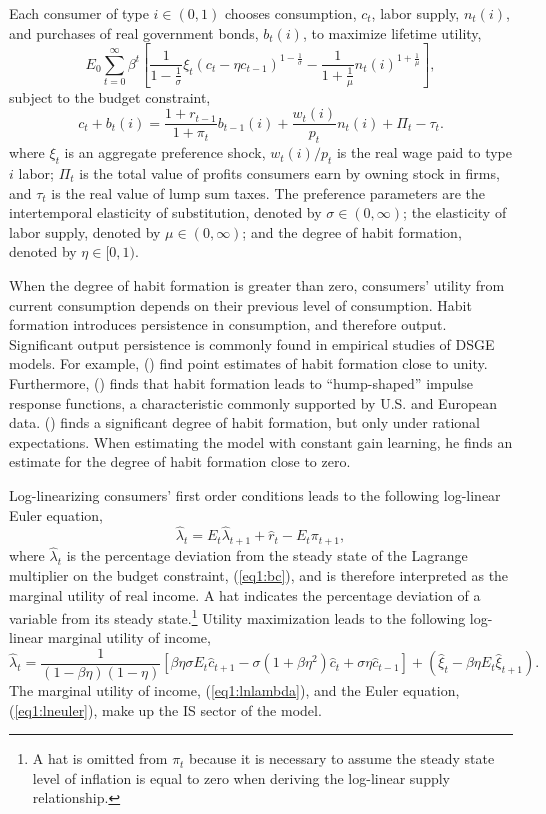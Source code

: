 \documentclass[11pt]{article}
\newcommand{\beq}{\begin{equation}}
\newcommand{\eeq}{\end{equation}}
\newcommand{\citee}[1]{\citeauthor*{#1} (\citeyear{#1})}
\newcommand{\h}[1]{\hat{#1}}
\begin{document}
Each consumer of type $i\in(0,1)$ chooses consumption, $c_t$, labor supply, $n_t(i)$, and purchases of real government bonds, $b_{t}(i)$, to maximize lifetime utility,
\beq \label{eq1:util} E_0 \sum_{t=0}^{\infty} \beta^t \left[ \frac{1}{1-\frac{1}{\sigma}} \xi_t \left(c_t - \eta c_{t-1}\right)^{1-\frac{1}{\sigma}} - \frac{1}{1+\frac{1}{\mu}} n_t(i)^{1+\frac{1}{\mu}} \right], \eeq
subject to the budget constraint, 
\beq \label{eq1:bc} c_t + b_t(i) = \frac{1+r_{t-1}}{1+\pi_t} b_{t-1}(i) + \frac{w_t(i)}{p_t} n_t(i) + \Pi_t - \tau_t. \eeq
where $\xi_t$ is an aggregate preference shock, $w_t(i)/p_t$ is the real wage paid to type $i$ labor; $\Pi_t$ is the total value of profits consumers earn by owning stock in firms, and $\tau_t$ is the real value of lump sum taxes.  The preference parameters are the intertemporal elasticity of substitution, denoted by $\sigma \in (0,\infty)$; the elasticity of labor supply, denoted by $\mu \in (0, \infty)$; and the degree of habit formation, denoted by $\eta \in [0,1)$.

When the degree of habit formation is greater than zero, consumers' utility from current consumption depends on their previous level of consumption.  Habit formation introduces persistence in consumption, and therefore output.  Significant output persistence is commonly found in empirical studies of DSGE models.  For example, \citee{smetswouters2005} find point estimates of habit formation close to unity.  Furthermore, \citee{fuhrer2000} finds that habit formation leads to ``hump-shaped'' impulse response functions, a characteristic commonly supported by U.S. and European data.  \citee{milani2007} finds a significant degree of habit formation, but only under rational expectations.  When estimating the model with constant gain learning, he finds an estimate for the degree of habit formation close to zero.   

Log-linearizing consumers' first order conditions leads to the following log-linear Euler equation,
\beq \label{eq1:lneuler} \h{\lambda}_{t} = E_t \h{\lambda}_{t+1} + \h{r}_t - E_t \pi_{t+1}, \eeq
where $\h{\lambda}_t$ is the percentage deviation from the steady state of the Lagrange multiplier on the budget constraint, (\ref{eq1:bc}), and is therefore interpreted as the marginal utility of real income.  A hat indicates the percentage deviation of a variable from its steady state.\footnote{A hat is omitted from $\pi_t$ because it is necessary to assume the steady state level of inflation is equal to zero when deriving the log-linear supply relationship.}  Utility maximization leads to the following log-linear marginal utility of income,
\beq \label{eq1:lnlambda} \h{\lambda}_t = \frac{1}{ (1-\beta \eta)(1-\eta)}\left[ \beta \eta \sigma E_t \h{c}_{t+1} - \sigma(1+\beta \eta^2) \h{c}_t + \sigma \eta \h{c}_{t-1} \right] + \left(\h{\xi}_t - \beta \eta E_t \h{\xi}_{t+1} \right). \eeq
The marginal utility of income, (\ref{eq1:lnlambda}), and the Euler equation, (\ref{eq1:lneuler}), make up the IS sector of the model.
\end{document}

